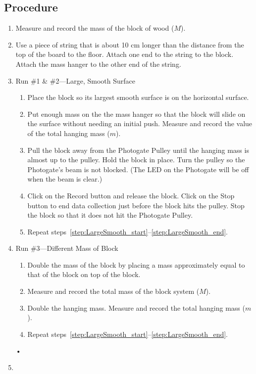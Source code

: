 \documentclass[main.tex]{subfiles}
\begin{document}
\subsection*{Procedure}
\begin{enumerate}
\item
Measure and record the mass of the block of wood ($M$).
\item
Use a piece of string that is about 10 cm longer than the distance from the top of the board to the floor. Attach one end to the string to the block. Attach the mass hanger to the other end of the string.
\item \label{step:LargeSmooth}
Run \#1 \& \#2---Large, Smooth Surface
\begin{enumerate}
\item \label{step:LargeSmooth_start}
Place the block so its largest smooth surface is on the horizontal surface.
\item
Put enough mass on the the mass hanger so that the block will slide on the surface without needing an initial push. Measure and record the value of the total hanging mass ($m$).
\item
Pull the block away from the Photogate Pulley until the hanging mass is almost up to the pulley. Hold the block in place. Turn the pulley so the Photogate's beam is not blocked. (The LED on the Photogate will be off when the beam is clear.)
\item \label{step:LargeSmooth_end}
Click on the Record button and release the block. Click on the Stop button to end data collection just before the block hits the pulley. Stop the block so that it does not hit the Photogate Pulley.
\item
Repeat steps~\ref{step:LargeSmooth_start}--\ref{step:LargeSmooth_end}.
\end{enumerate}
\item
Run \#3---Different Mass of Block
\begin{enumerate}
\item
Double the mass of the block by placing a mass approximately equal to that of the block on top of the block.
\item
Measure and record the total mass of the block system ($M$).
\item
Double the hanging mass. Measure and record the total hanging mass ($m$).
\item
Repeat steps~\ref{step:LargeSmooth_start}--\ref{step:LargeSmooth_end}.
\end{enumerate}•
\item

\end{enumerate}
\end{document}
